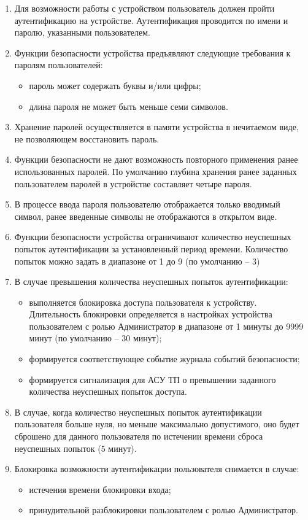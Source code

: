 \begin{enumerate}[label=\arabic{section}.\arabic{subsection}.\arabic*, labelsep=4pt, leftmargin=0pt, itemindent=57pt]
\begin{enumerate}[label=\arabic{section}.\arabic{subsection}.\arabic{enumi}.\arabic*, labelsep=4pt, leftmargin=0em, itemindent=65pt, parsep=0pt]
\item
Для возможности работы с устройством пользователь должен пройти аутентификацию на устройстве. Аутентификация проводится по имени и паролю, указанными пользователем. 
\item
Функции безопасности устройства предъявляют следующие требования к паролям пользователей:
\begin{itemize}
    \item пароль может содержать буквы и/или цифры;
    \item длина пароля не может быть меньше семи символов. 
\end{itemize}
\item
Хранение паролей осуществляется в памяти устройства в нечитаемом виде, не позволяющем восстановить пароль.
\item
Функции безопасности не дают возможность повторного применения ранее использованных паролей. По умолчанию глубина хранения ранее заданных пользователем паролей в устройстве составляет четыре пароля.
\item
В процессе ввода пароля пользователю отображается только вводимый символ, ранее введенные символы не отображаются в открытом виде.
\item
Функции безопасности устройства ограничивают количество неуспешных попыток аутентификации за установленный период времени. Количество попыток можно задать в диапазоне от 1 до 9 (по умолчанию – 3)
\item
В случае превышения количества неуспешных попыток аутентификации:
\begin{itemize}
    \item выполняется блокировка доступа пользователя к устройству. Длительность блокировки определяется в настройках устройства пользователем с ролью Администратор в диапазоне от 1 минуты до 9999 минут (по умолчанию – 30 минут);
    \item формируется соответствующее событие журнала событий безопасности;
    \item формируется сигнализация для АСУ ТП о превышении заданного количества неуспешных попыток доступа. 
\end{itemize}
\item
В случае, когда количество неуспешных попыток аутентификации пользователя больше нуля, но меньше максимально допустимого, оно будет сброшено для данного пользователя по истечении времени сброса неуспешных попыток (5 минут).
\item
Блокировка возможности аутентификации пользователя снимается в случае:
\begin{itemize}
    \item истечения времени блокировки входа;
    \item принудительной разблокировки пользователем с ролью Администратор. 
\end{itemize}


\end{enumerate}
\end{enumerate}
